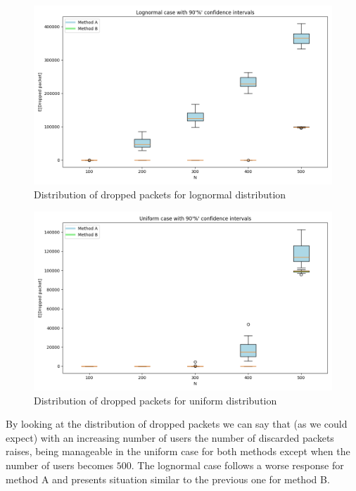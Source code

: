\documentclass{report}
\begin{document}
\begin{figure}[H]
    \centering
    \includegraphics[width=\textwidth]{img/Grafici/DroppedPacket Lognormal Small.png}
    \caption{Distribution of dropped packets for lognormal distribution}
\end{figure}
\begin{figure}[H]
    \centering
    \includegraphics[width=\textwidth]{img/Grafici/DroppedPacket Uniform differentScale Small.png}
    \caption{Distribution of dropped packets for uniform distribution}
\end{figure}

\begin{flushleft}
By looking at the distribution of dropped packets we can say that (as we could expect) with an increasing number of users the number of discarded packets raises, being manageable in the uniform case for both methods except when the number of users becomes $500$.
The lognormal case follows a worse response for method A and presents situation similar to the previous one for method B. 
\end{flushleft}
\end{document}

